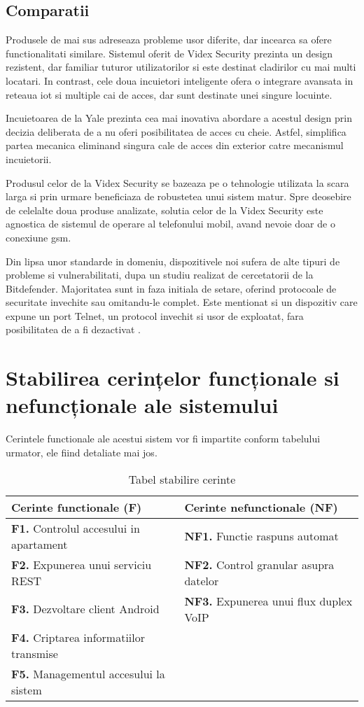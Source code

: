 \subsection {Comparatii}

Produsele de mai sus adreseaza probleme usor diferite, dar incearca sa ofere functionalitati similare. Sistemul oferit de Videx Security prezinta un design rezistent, dar familiar tuturor utilizatorilor si este destinat cladirilor cu mai multi locatari. In contrast, cele doua incuietori inteligente ofera o integrare avansata in reteaua \acrshort{iot} si multiple cai de acces, dar sunt destinate unei singure locuinte.

Incuietoarea de la Yale prezinta cea mai inovativa abordare a acestul design prin decizia deliberata de a nu oferi posibilitatea de acces cu cheie. Astfel, simplifica partea mecanica eliminand singura cale de acces din exterior catre mecanismul incuietorii.

Produsul celor de la Videx Security se bazeaza pe o tehnologie utilizata la scara larga si prin urmare beneficiaza de robustetea unui sistem matur. Spre deosebire de celelalte doua produse analizate, solutia celor de la Videx Security este agnostica de sistemul de operare al telefonului mobil, avand nevoie doar de o conexiune \acrshort{gsm}.

Din lipsa unor standarde in domeniu, dispozitivele noi sufera de alte tipuri de probleme si vulnerabilitati, dupa un studiu realizat de cercetatorii de la Bitdefender. Majoritatea sunt in faza initiala de setare, oferind protocoale de securitate invechite sau omitandu-le complet. Este mentionat si un dispozitiv care expune un port Telnet, un protocol invechit si usor de exploatat, fara posibilitatea de a fi dezactivat \cite{Bitdefender2016IoT}.

\section {Stabilirea cerințelor funcționale si nefuncționale ale sistemului}

Cerintele functionale ale acestui sistem vor fi impartite conform tabelului urmator, ele fiind detaliate mai jos.

\begin{table}[ht!]
\begin{tabular}{l|l}
\hline
Cerinte functionale (F) & Cerinte nefunctionale (NF) \\
\hline
\hline
\textbf{F1.} Controlul accesului in apartament & \textbf{NF1.} Functie raspuns automat \\
\hline
\textbf{F2.} Expunerea unui serviciu REST & \textbf{NF2.} Control granular asupra datelor \\
\hline
\textbf{F3.} Dezvoltare client Android & \textbf{NF3.} Expunerea unui flux duplex VoIP \\
\hline
\textbf{F4.} Criptarea informatiilor transmise & \\
\hline
\textbf{F5.} Managementul accesului la sistem & \\
\hline
\end{tabular}
\centering
\caption{Tabel stabilire cerinte}
\label{tab:funcnefunc}
\end{table}

